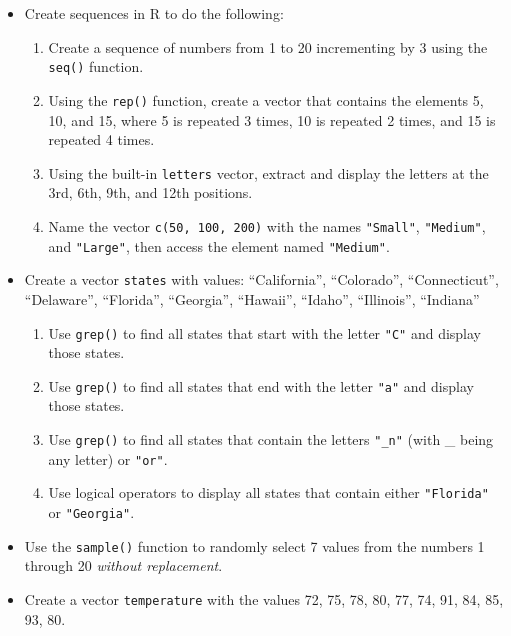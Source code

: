 \documentclass[
  letterpaper,
  DIV=11,
  numbers=noendperiod]{scrreprt}
\providecommand{\tightlist}{%
  \setlength{\itemsep}{0pt}\setlength{\parskip}{0pt}}
\begin{document}
\begin{itemize}
\item
  Create sequences in R to do the following:

  \begin{enumerate}
  \def\labelenumi{\alph{enumi})}
  \tightlist
  \item
    Create a sequence of numbers from 1 to 20 incrementing by 3 using
    the \texttt{seq()} function.\\
  \item
    Using the \texttt{rep()} function, create a vector that contains the
    elements 5, 10, and 15, where 5 is repeated 3 times, 10 is repeated
    2 times, and 15 is repeated 4 times.\\
  \item
    Using the built-in \texttt{letters} vector, extract and display the
    letters at the 3rd, 6th, 9th, and 12th positions.
  \item
    Name the vector \texttt{c(50,\ 100,\ 200)} with the names
    \texttt{"Small"}, \texttt{"Medium"}, and \texttt{"Large"}, then
    access the element named \texttt{"Medium"}.
  \end{enumerate}
\item
  Create a vector \texttt{states} with values: ``California'',
  ``Colorado'', ``Connecticut'', ``Delaware'', ``Florida'', ``Georgia'',
  ``Hawaii'', ``Idaho'', ``Illinois'', ``Indiana''

  \begin{enumerate}
  \def\labelenumi{\alph{enumi})}
  \tightlist
  \item
    Use \texttt{grep()} to find all states that start with the letter
    \texttt{"C"} and display those states.
  \item
    Use \texttt{grep()} to find all states that end with the letter
    \texttt{"a"} and display those states.
  \item
    Use \texttt{grep()} to find all states that contain the letters
    \texttt{"\_n"} (with \_ being any letter) or \texttt{"or"}.
  \item
    Use logical operators to display all states that contain either
    \texttt{"Florida"} or \texttt{"Georgia"}.
  \end{enumerate}
\item
  Use the \texttt{sample()} function to randomly select 7 values from
  the numbers 1 through 20 \emph{without replacement}.
\item
  Create a vector \texttt{temperature} with the values 72, 75, 78, 80,
  77, 74, 91, 84, 85, 93, 80.


\end{itemize}
\end{document}
